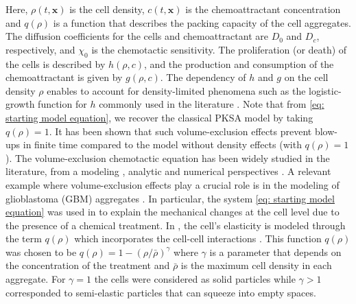 \documentclass{article}
\begin{document}
{Here, $\rho(t,\mathbf{x})$ is the cell density, $c(t,\mathbf{x})$ is the chemoattractant concentration and  $q(\rho)$ is a function that describes the packing capacity of the cell aggregates.  The diffusion coefficients for the cells and chemoattractant are $D_0$ and $D_c$, respectively, and $\chi_0$ is the chemotactic sensitivity. The proliferation (or death) of the cells is described by $h(\rho,c)$,  and the production and consumption of the chemoattractant is given by $g(\rho,c)$. The dependency of $h$ and $g$ on the cell density $\rho$ enables to account for density-limited phenomena such as the logistic-growth function for $h$ commonly used in the literature \cite{murray2002introduction,murray2003mathematical}. Note that from \eqref{eq: starting model equation}, we recover the classical PKSA model by taking $q(\rho) = 1$.  It has been shown \cite{wrzosek2010volume,calvez2006volume,zheng2015boundedness} that such volume-exclusion effects prevent blow-ups in finite time compared to the model without density effects (with $q(\rho) = 1$). The volume-exclusion chemotactic equation has been widely studied in the literature, from a modeling \cite{painter2002volume,wang2010chemotaxis}, analytic \cite{wrzosek2010volume,han2017pattern,ma2012stationary,dolak2005keller} and numerical perspectives \cite{ibrahim2014efficacy}. A relevant example where volume-exclusion effects play a crucial role is in the modeling of glioblastoma (GBM) aggregates  \cite{Vital2011}. In particular, the  system \eqref{eq: starting model equation} was used in \cite{almeida2020treatment} to explain the mechanical changes at the cell level  due to the presence of a chemical treatment. In \cite{almeida2020treatment}, the cell's elasticity is modeled through the term $q(\rho)$ which incorporates the cell-cell interactions \cite{wang2007classical}. This function $q(\rho)$ was chosen to be $q(\rho)=1-(\rho/\bar{\rho})^\gamma$ where $\gamma$ is a parameter that depends on the concentration of the treatment and $\bar{\rho}$ is the maximum cell density in each aggregate. For $\gamma=1$ the cells were considered as solid particles while {$\gamma>1$  corresponded to semi-elastic particles} that can squeeze into empty spaces. 


}
\end{document}

